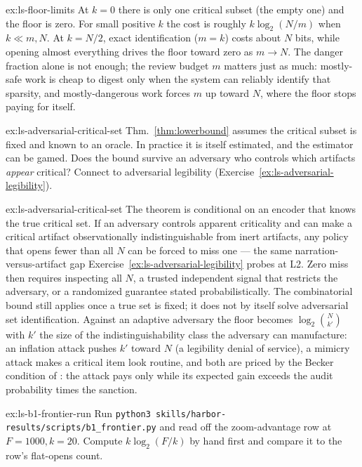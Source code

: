 \documentclass[11pt,a4paper]{article}
\theoremstyle{definition}
\theoremstyle{plain}
\begin{document}
\begin{pdsolution}{ex:ls-floor-limits}
At $k=0$ there is only one critical subset (the empty one) and the floor is zero. For small positive $k$ the cost is roughly $k\log_2(N/m)$ when $k\ll m,N$. At $k=N/2$, exact identification ($m=k$) costs about $N$ bits, while opening almost everything drives the floor toward zero as $m\to N$. The danger fraction alone is not enough; the review budget $m$ matters just as much: mostly-safe work is cheap to digest only when the system can reliably identify that sparsity, and mostly-dangerous work forces $m$ up toward $N$, where the floor stops paying for itself.
\end{pdsolution}
\begin{pdexercise}[kind=Open,rating=3]{ex:ls-adversarial-critical-set}
Thm.~\ref{thm:lowerbound} assumes the critical subset is
fixed and known to an oracle. In practice it is itself estimated, and the estimator
can be gamed. Does the bound survive an adversary who controls which artifacts
\emph{appear} critical? Connect to adversarial legibility (Exercise~\ref{ex:ls-adversarial-legibility}).
\end{pdexercise}
\begin{pdsolution}{ex:ls-adversarial-critical-set}
The theorem is conditional on an encoder that knows the true critical set. If an adversary controls apparent criticality and can make a critical artifact observationally indistinguishable from inert artifacts, any policy that opens fewer than all $N$ can be forced to miss one --- the same narration-versus-artifact gap Exercise~\ref{ex:ls-adversarial-legibility} probes at L2. Zero miss then requires inspecting all $N$, a trusted independent signal that restricts the adversary, or a randomized guarantee stated probabilistically. The combinatorial bound still applies once a true set is fixed; it does not by itself solve adversarial set identification. Against an adaptive adversary the floor becomes $\log_2\binom{N}{k'}$ with $k'$ the size of the indistinguishability class the adversary can manufacture: an inflation attack pushes $k'$ toward $N$ (a legibility denial of service), a mimicry attack makes a critical item look routine, and both are priced by the Becker condition of : the attack pays only while its expected gain exceeds the audit probability times the sanction.
\end{pdsolution}
\begin{pdexercise}[kind=Trace,rating=2]{ex:ls-b1-frontier-run}
Run \texttt{python3 skills/harbor-results/scripts/b1\_frontier.py} and read off the
zoom-advantage row at $F{=}1000,k{=}20$. Compute $k\log_2(F/k)$ by hand first and
compare it to the row's flat-opens count.
\end{pdexercise}
\end{document}
